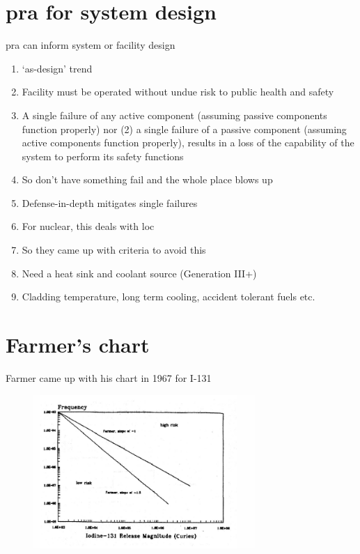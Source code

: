 \documentclass[aspectratio=1610,pdftex,dvipsnames,compress,xcolor={dvipsnames}]{beamer}
\newcommand{\acs}{\acrshort} %
\begin{document}
\section{\acs{pra} for system design}


\addtocounter{framenumber}{-1}
\begin{frame}{\acs{pra} can inform system or facility design}
    \begin{enumerate}[series=outerlist,topsep=0pt,itemsep=7pt,leftmargin=*,label=(\arabic*)]
        \item[]`as-design' trend
        \item[]Facility must be operated without undue risk to public health and safety
        \item[]A single failure of any active component (assuming passive components function properly) nor (2) a single failure of a passive component (assuming active components function properly), results in a loss of the capability of the system to perform its safety functions
        \item[]So don't have something fail and the whole place blows up
        \item[]Defense-in-depth mitigates single failures
        \item[]For nuclear, this deals with \acs{loc}
        \item[]So they came up with criteria to avoid this
        \item[]Need a heat sink and coolant source (Generation III+)  
        \item[]Cladding temperature, long term cooling, accident tolerant fuels etc.
    \end{enumerate}
\end{frame}


\section{Farmer's chart}


\addtocounter{framenumber}{-1}
\begin{frame}{Farmer came up with his chart in 1967 for I-131}
    \begin{figure}
        \centering
        \includegraphics[width=0.75\textwidth]{farmers.chart.jpg}
    \end{figure}
\end{frame}
\end{document}
